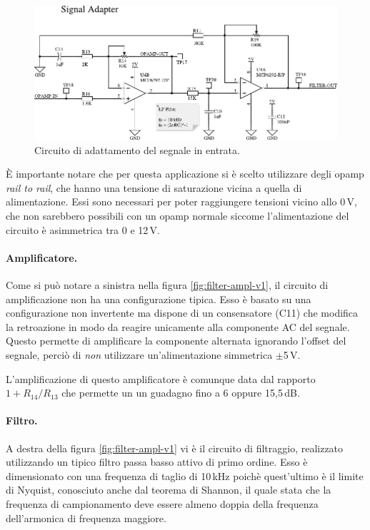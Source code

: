 \begin{figure}[H] \centering
    \includegraphics[width=.9\linewidth]{figures/circuits/filter-ampl-v2.pdf}
    \caption[Circuito di adattamento del segnale]{
        Circuito di adattamento del segnale in entrata.
        \label{fig:filter-ampl-v2}
    }
\end{figure}

\`E importante notare che per questa applicazione si \`e scelto utilizzare
degli opamp \emph{rail to rail}, che hanno una tensione di saturazione vicina
a quella di alimentazione. Essi sono necessari per poter raggiungere tensioni
vicino allo 0\,V, che non sarebbero possibili con un opamp normale siccome
l'alimentazione del circuito \`e asimmetrica tra 0 e 12\,V.

\paragraph{Amplificatore.} Come si pu\`o notare a sinistra nella figura
\ref{fig:filter-ampl-v1}, il circuito di amplificazione non ha una configurazione
tipica. Esso \`e basato su una configurazione non invertente ma dispone di un
consensatore (C11) che modifica la retroazione in modo da reagire unicamente
alla componente AC del segnale. Questo permette di amplificare la componente
alternata ignorando l'offset del segnale, perci\`o di \emph{non} utilizzare
un'alimentazione simmetrica \(\pm\)5\,V.

L'amplificazione di questo amplificatore \`e comunque data dal rapporto
\(1+R_{14}/R_{13}\) che permette un un guadagno fino a 6 oppure 15,5\,dB.

\paragraph{Filtro.} A destra della figura \ref{fig:filter-ampl-v1} vi \`e il
circuito di filtraggio, realizzato utilizzando un tipico filtro passa basso
attivo di primo ordine. Esso \`e dimensionato con una frequenza di taglio di
10\,kHz poich\`e quest'ultimo \`e il limite di Nyquist, conosciuto anche dal
teorema di Shannon, il quale stata che la frequenza di campionamento deve
essere almeno doppia della frequenza dell'armonica di frequenza maggiore.


